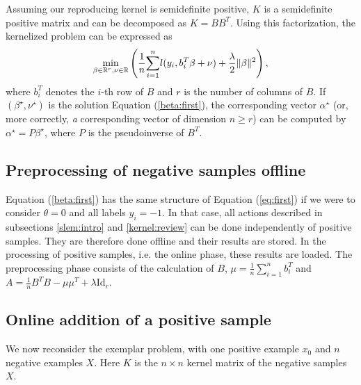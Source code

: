 


Assuming our reproducing kernel is semidefinite positive, 
$K$ is a semidefinite positive matrix and can be decomposed as $K=BB^T$.
Using this factorization, the kernelized problem can be expressed as 
\begin{equation}
\min_{\beta\in\mathbb R^r,\nu\in\mathbb R} \left( \dfrac{1}{n}\displaystyle{\sum_{i=1}^n} l(y_i, b_i^T\beta+\nu)+\dfrac{\lambda}{2}\|\beta\|^2\right), \label{beta:first}
\end{equation}
where $b_i^T$ denotes the $i$-th row of $B$ and $r$ is the number of columns of $B$. 
If $(\beta^\star, \nu^\star)$ is the solution Equation (\ref{beta:first}), the corresponding vector $\alpha^\star$ (or, more correctly, \textit{a} corresponding vector of dimension $n\geq r$) 
can be computed by $\alpha^\star=P\beta^\star$, where $P$ is the pseudoinverse of $B^T$.

\subsection{Preprocessing of negative samples offline}\label{offline}
Equation (\ref{beta:first}) has the same structure of Equation (\ref{eq:first}) if we were to consider $\theta=0$ and all labels $y_i=-1$.
In that case, all actions described in subsections \ref{slem:intro} and \ref{kernel:review} can be done independently of positive samples. 
They are therefore done offline and their results are stored. In the processing of positive samples, i.e. the online phase, these results are loaded.
The preprocessing phase consists of the calculation of $B$, $\mu = \frac{1}{n}\sum_{i=1}^n b_i^T$ and $A = \frac{1}{n}B^TB-\mu\mu^T +\lambda\mathrm{Id}_r.$

\subsection{Online addition of a positive sample}
\label{subsec:adding}
We now reconsider the exemplar problem, with one positive example $x_0$ and $n$ negative examples $X$. Here $K$ is the $n\times n$ kernel matrix of the negative samples $X$. 


